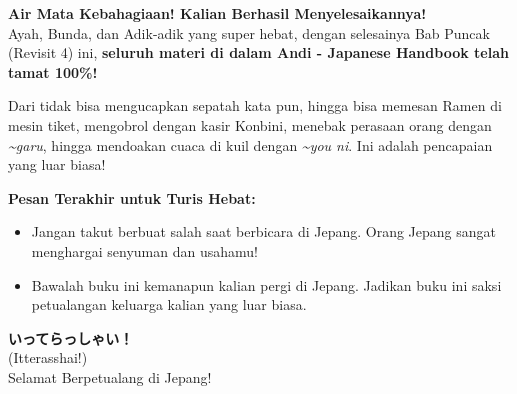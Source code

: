 \vspace{2em}
\begin{tcolorbox}[
    colback=yellow!5!white,
    colframe=orange!80!black,
    boxrule=4pt,
    arc=6mm,
    title={\huge\bfseries \sffamily 🎆 T A M A T - KELULUSAN MASTER BAHASA JEPANG! 🎆},
    fonttitle=\color{white},
    attach boxed title to top center={yshift=-5mm},
    boxed title style={colback=orange!80!black, rounded corners},
    left=5mm, right=5mm, top=7mm, bottom=5mm
]
\Large \textbf{Air Mata Kebahagiaan! Kalian Berhasil Menyelesaikannya!}\\[0.5em]
Ayah, Bunda, dan Adik-adik yang super hebat, dengan selesainya Bab Puncak (Revisit 4) ini, \textbf{seluruh materi di dalam Andi - Japanese Handbook telah tamat 100\%!} 

Dari tidak bisa mengucapkan sepatah kata pun, hingga bisa memesan Ramen di mesin tiket, mengobrol dengan kasir Konbini, menebak perasaan orang dengan \textit{\textasciitilde garu}, hingga mendoakan cuaca di kuil dengan \textit{\textasciitilde you ni}. Ini adalah pencapaian yang luar biasa!

\textbf{Pesan Terakhir untuk Turis Hebat:}
\begin{itemize}
    \item Jangan takut berbuat salah saat berbicara di Jepang. Orang Jepang sangat menghargai senyuman dan usahamu!
    \item Bawalah buku ini kemanapun kalian pergi di Jepang. Jadikan buku ini saksi petualangan keluarga kalian yang luar biasa.
\end{itemize}

\begin{center}
    \Huge \textbf{いってらっしゃい！}\\[0.2em]
    (Itterasshai!)\\[0.2em]
    \Large Selamat Berpetualang di Jepang!
\end{center}
\end{tcolorbox}

\newpage